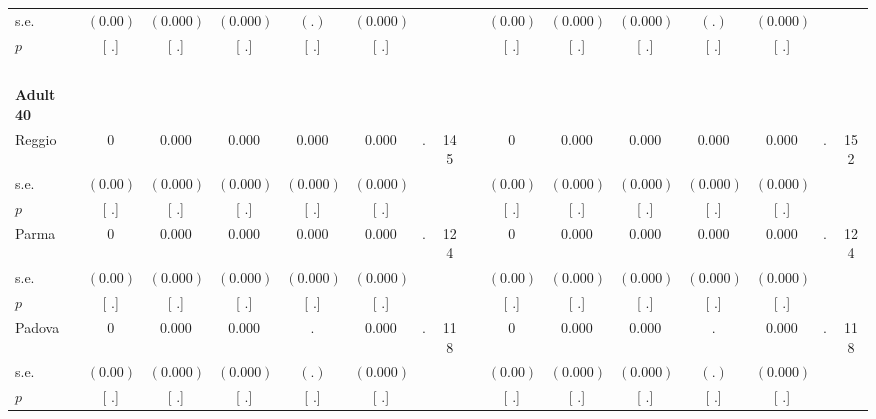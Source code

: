 \begin{longtable}{L{8em} c c c c c c c p{1em} c c c c c c c}
\quad \quad \quad \quad s.e.& $ (     0.00)$ & $ (    0.000)$ & $ (    0.000)$ & $ (        .)$ & $ (    0.000)$ & & & & $ (     0.00)$ & $ (    0.000)$ & $ (    0.000)$ & $ (        .)$ & $ (    0.000)$ & &  \\*
\quad \quad \quad \quad $ p$ & [        .] & [        .] & [        .] & [        .] & [        .] & & & & [        .] & [        .] & [        .] & [        .] & [        .] & &  \\[1em]
~\\[1em]
\quad \quad \textbf{Adult 40} & & & & & & & & & & & & & & & \\* 
\quad \quad \quad Reggio& 0 &     0.000 &     0.000 &     0.000 &     0.000 &         . &       145 & & 0 &     0.000 &     0.000 &     0.000 &     0.000 &         . &       152  \\*
\quad \quad \quad \quad s.e.& $ (     0.00)$ & $ (    0.000)$ & $ (    0.000)$ & $ (    0.000)$ & $ (    0.000)$ & & & & $ (     0.00)$ & $ (    0.000)$ & $ (    0.000)$ & $ (    0.000)$ & $ (    0.000)$ & &  \\*
\quad \quad \quad \quad $ p$ & [        .] & [        .] & [        .] & [        .] & [        .] & & & & [        .] & [        .] & [        .] & [        .] & [        .] & &  \\[1em]
\quad \quad \quad Parma& 0 &     0.000 &     0.000 &     0.000 &     0.000 &         . &       124 & & 0 &     0.000 &     0.000 &     0.000 &     0.000 &         . &       124  \\*
\quad \quad \quad \quad s.e.& $ (     0.00)$ & $ (    0.000)$ & $ (    0.000)$ & $ (    0.000)$ & $ (    0.000)$ & & & & $ (     0.00)$ & $ (    0.000)$ & $ (    0.000)$ & $ (    0.000)$ & $ (    0.000)$ & &  \\*
\quad \quad \quad \quad $ p$ & [        .] & [        .] & [        .] & [        .] & [        .] & & & & [        .] & [        .] & [        .] & [        .] & [        .] & &  \\[1em]
\quad \quad \quad Padova& 0 &     0.000 &     0.000 &         . &     0.000 &         . &       118 & & 0 &     0.000 &     0.000 &         . &     0.000 &         . &       118  \\*
\quad \quad \quad \quad s.e.& $ (     0.00)$ & $ (    0.000)$ & $ (    0.000)$ & $ (        .)$ & $ (    0.000)$ & & & & $ (     0.00)$ & $ (    0.000)$ & $ (    0.000)$ & $ (        .)$ & $ (    0.000)$ & &  \\*
\quad \quad \quad \quad $ p$ & [        .] & [        .] & [        .] & [        .] & [        .] & & & & [        .] & [        .] & [        .] & [        .] & [        .] & &  \\[1em]

\end{longtable}
